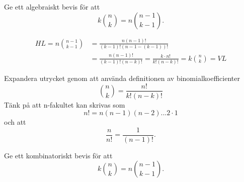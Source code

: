 \documentclass{tufte-handout}
\begin{document}
\begin{xca}
	Ge ett algebraiskt bevis för att
	$$k\binom{n}{k} = n \binom{n-1}{k-1}.$$
\end{xca}

\begin{solution}
	\begin{align*}
		HL = n \binom{n-1}{k-1} &= \frac{n(n-1)!}{(k-1)!(n-1-(k-1))!}\\
		 &= \frac{n(n-1)!}{(k-1)!(n-k)!} = \frac{k\cdot n!}{k!(n-k)!} = k\binom{n}{k} = VL	
	\end{align*}
    
	\begin{tips}
		Expandera utrycket genom att använda definitionen av binomialkoefficienter
		$$\binom{n}{k} = \frac{n!}{k!(n-k)!}$$
		Tänk på att n-fakultet kan skrivas som
		$$n! = n(n-1)(n-2)...2\cdot 1$$ 
		och att
		$$\frac{n}{n!} = \frac{1}{(n-1)!}.$$
	\end{tips}
\end{solution}
    
\begin{xca}
	Ge ett kombinatoriskt bevis för att
	$$k\binom{n}{k} = n \binom{n-1}{k-1}.$$
\end{xca}
\end{document}
